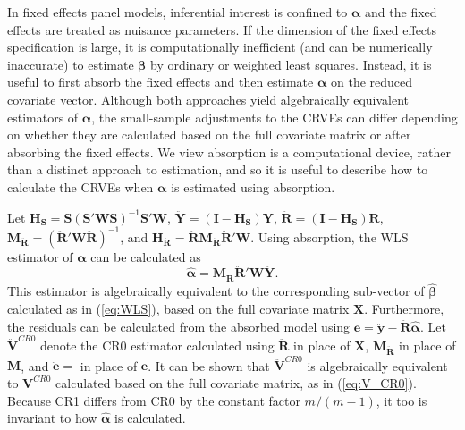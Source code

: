 \documentclass[12pt]{article}\usepackage[]{graphicx}\usepackage[]{color}
\newcommand{\bm}{\mathbf}
\newcommand{\bs}{\boldsymbol}
\begin{document}
In fixed effects panel models, inferential interest is confined to $\bs\alpha$ and the fixed effects are treated as nuisance parameters. 
If the dimension of the fixed effects specification is large, it is computationally inefficient (and can be numerically inaccurate) to estimate $\bs\beta$ by ordinary or weighted least squares. 
Instead, it is useful to first absorb the fixed effects and then estimate $\bs\alpha$ on the reduced covariate vector.
Although both approaches yield algebraically equivalent estimators of $\bs\alpha$, the small-sample adjustments to the CRVEs can differ depending on whether they are calculated based on the full covariate matrix or after absorbing the fixed effects. 
We view absorption is a computational device, rather than a distinct approach to estimation, and so it is useful to describe how to calculate the CRVEs when $\bs\alpha$ is estimated using absorption.

Let $\bm{H_S} = \bm{S}\left(\bm{S}'\bm{W}\bm{S}\right)^{-1} \bm{S}'\bm{W}$, $\bm{\ddot{Y}} = \left(\bm{I} - \bm{H_S}\right)\bm{Y}$, $\bm{\ddot{R}} = \left(\bm{I} - \bm{H_S}\right)\bm{R}$, $\bm{M_{\ddot{R}}} = \left(\bm{\ddot{R}}' \bm{W} \bm{\ddot{R}}\right)^{-1}$, and $\bm{H_{\ddot{R}}} = \bm{\ddot{R}}\bm{M_{\ddot{R}}} \bm{\ddot{R}}' \bm{W}$. 
Using absorption, the WLS estimator of $\bs\alpha$ can be calculated as \[
\bs{\hat\alpha} = \bm{M_{\ddot{R}}} \bm{\ddot{R}}' \bm{W} \bm{\ddot{Y}}. \]
This estimator is algebraically equivalent to the corresponding sub-vector of $\bs{\hat\beta}$  calculated as in (\ref{eq:WLS}), based on the full covariate matrix $\bm{X}$. 
Furthermore, the residuals can be calculated from the absorbed model using $\bm{e} = \bm{\ddot{y}} - \bm{\ddot{R}} \bs{\hat\alpha}$.
Let $\bm{\ddot{V}}^{CR0}$ denote the CR0 estimator calculated using $\bm{\ddot{R}}$ in place of $\bm{X}$, $\bm{M_{\ddot{R}}}$ in place of $\bm{M}$, and $\bm{\ddot{e}} = $ in place of $\bm{e}$. It can be shown that $\bm{\ddot{V}}^{CR0}$ is algebraically equivalent to $\bm{V}^{CR0}$ calculated based on the full covariate matrix, as in (\ref{eq:V_CR0}). 
Because CR1 differs from CR0 by the constant factor $m / (m - 1)$, it too is invariant to how $\bs{\hat\alpha}$ is calculated. 
\end{document}
